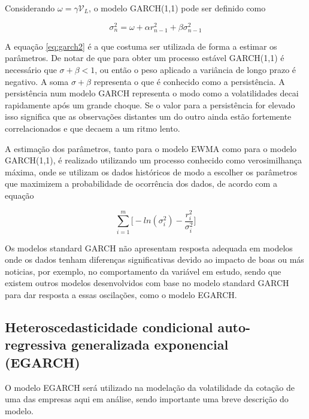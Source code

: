\documentclass[
  12pt,
  a4paper,
  openany]{book}
\theoremstyle{definition}
\theoremstyle{definition}
\theoremstyle{definition}
\theoremstyle{remark}
\begin{document}
Considerando \(\omega=\gamma\mathcal{V}_{L}\), o modelo GARCH(1,1) pode ser definido como

\begin{equation} 
  \sigma_{n}^{2} = \omega + \alpha r_{n-1}^{2} + \beta\sigma_{n-1}^{2}
  \label{eq:garch2}
\end{equation}

A equação \eqref{eq:garch2} é a que costuma ser utilizada de forma a estimar os parâmetros. De notar de que para obter um processo estável GARCH(1,1) é necessário que \(\sigma+\beta<1\), ou então o peso aplicado a variância de longo prazo é negativo. A soma \(\sigma+\beta\) representa o que é conhecido como a persistência. A persistência num modelo GARCH representa o modo como a volatilidades decai rapidamente após um grande choque. Se o valor para a persistência for elevado isso significa que as observações distantes um do outro ainda estão fortemente correlacionados e que decaem a um ritmo lento.

A estimação dos parâmetros, tanto para o modelo EWMA como para o modelo GARCH(1,1), é realizado utilizando um processo conhecido como verosimilhança máxima, onde se utilizam os dados históricos de modo a escolher os parâmetros que maximizem a probabilidade de ocorrência dos dados, de acordo com a equação

\begin{equation} 
  \sum_{i=1}^{m}\bigg[-ln(\sigma_{i}^{2})-\frac{r_{i}^{2}}{\sigma_{i}^{2}}\bigg]
  \label{eq:mgarch}
\end{equation}

Os modelos standard GARCH não apresentam resposta adequada em modelos onde os dados tenham diferenças significativas devido ao impacto de boas ou más noticias, por exemplo, no comportamento da variável em estudo, sendo que existem outros modelos desenvolvidos com base no modelo standard GARCH para dar resposta a essas oscilações, como o modelo EGARCH.

\hypertarget{heteroscedasticidade-condicional-auto-regressiva-generalizada-exponencial-egarch}{%
\subsection{Heteroscedasticidade condicional auto-regressiva generalizada exponencial (EGARCH)}\label{heteroscedasticidade-condicional-auto-regressiva-generalizada-exponencial-egarch}}

O modelo EGARCH será utilizado na modelação da volatilidade da cotação de uma das empresas aqui em análise, sendo importante uma breve descrição do modelo.
\end{document}
